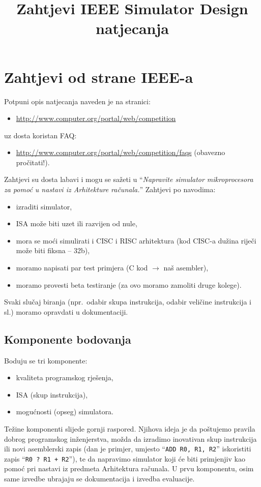 \documentclass{article}
\title{Zahtjevi IEEE Simulator Design natjecanja}
\begin{document}
\maketitle
\section{Zahtjevi od strane IEEE-a}
Potpuni opis natjecanja naveden je na stranici:
\begin{itemize}
  \item \url{http://www.computer.org/portal/web/competition}
\end{itemize}
uz dosta koristan FAQ:
\begin{itemize}
  \item \url{http://www.computer.org/portal/web/competition/faqs} (obavezno pročitati!).
\end{itemize}
Zahtjevi su dosta labavi i mogu se sažeti u
``\emph{Napravite simulator mikroprocesora za pomoć u nastavi iz Arhitekture računala.}''
Zahtjevi po navodima:
\begin{itemize}
  \item izraditi simulator,
  \item ISA može biti uzet ili razvijen od nule,
  \item mora se moći simulirati i CISC i RISC arhitektura (kod CISC-a dužina riječi može biti fiksna -- 32b),
  \item moramo napisati par test primjera (C kod $\rightarrow$ naš asembler),
  \item moramo provesti beta testiranje (za ovo moramo zamoliti druge kolege).
\end{itemize}
Svaki slučaj biranja (npr.\ odabir skupa instrukcija, odabir veličine instrukcija
i sl.) moramo opravdati u dokumentaciji.

\subsection{Komponente bodovanja}
Boduju se tri komponente:
\begin{itemize}
  \item kvaliteta programskog rješenja,
  \item ISA (skup instrukcija),
  \item mogućnosti (opseg) simulatora.
\end{itemize}
Težine komponenti slijede gornji raspored. Njihova ideja je da 
poštujemo pravila dobrog programskog inženjerstva, možda da izradimo inovativan
skup instrukcija ili novi asemblerski zapis (dan je primjer, umjesto
``{\tt ADD R0, R1, R2}'' iskoristiti zapis ``{\tt R0 ? R1 + R2}''), te da napravimo
simulator koji će biti primjenjiv kao pomoć pri nastavi iz predmeta Arhitektura
računala. U prvu komponentu, osim same izvedbe ubrajaju se dokumentacija i
izvedba evaluacije.
\end{document}
